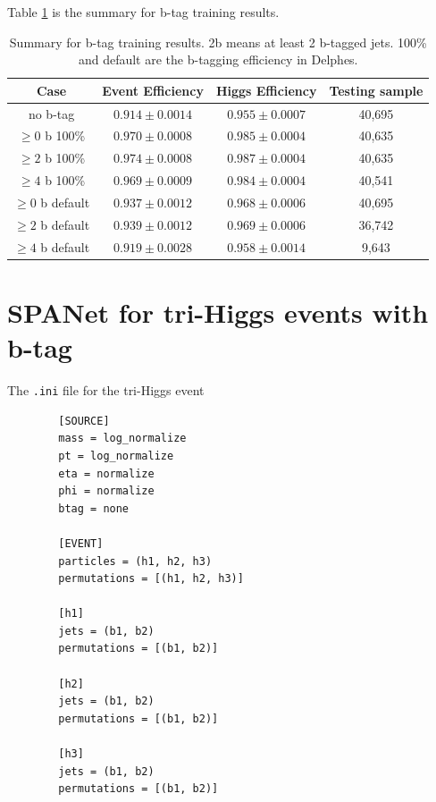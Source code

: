 \documentclass[12pt]{article}
\begin{document}
		Table \ref{tab:comparision_btag_results} is the summary for b-tag training results.
		\begin{table}[htpb]
			\centering
			\caption{Summary for b-tag training results. 2b means at least 2 b-tagged jets. 100\% and default are the b-tagging efficiency in Delphes.}
			\label{tab:comparision_btag_results}
			\begin{tabular}{c|cc|c}
				Case & Event Efficiency & Higgs Efficiency & Testing sample \\
				\hline
				no b-tag	         &  $0.914 \pm 0.0014$   &  $0.955 \pm 0.0007$  &  40,695	\\
				$\ge 0$ b 100\%	     &  $0.970 \pm 0.0008$   &  $0.985 \pm 0.0004$  &  40,635	\\
				$\ge 2$ b 100\%	     &  $0.974 \pm 0.0008$   &  $0.987 \pm 0.0004$  &  40,635	\\
				$\ge 4$ b 100\%	     &  $0.969 \pm 0.0009$   &  $0.984 \pm 0.0004$  &  40,541	\\
				$\ge 0$ b default	 &  $0.937 \pm 0.0012$   &  $0.968 \pm 0.0006$  &  40,695	\\
				$\ge 2$ b default	 &  $0.939 \pm 0.0012$   &  $0.969 \pm 0.0006$  &  36,742	\\
				$\ge 4$ b default	 &  $0.919 \pm 0.0028$   &  $0.958 \pm 0.0014$  &  9,643	\\
			\end{tabular}
		\end{table}



\section{SPANet for tri-Higgs events with b-tag}%
\label{sec:spanet_for_tri_higgs_events_with_b_tag}
	The \verb+.ini+ file for the tri-Higgs event
	\begin{verbatim}
		[SOURCE]
		mass = log_normalize
		pt = log_normalize
		eta = normalize
		phi = normalize
		btag = none

		[EVENT]
		particles = (h1, h2, h3)
		permutations = [(h1, h2, h3)]

		[h1]
		jets = (b1, b2)
		permutations = [(b1, b2)]

		[h2]
		jets = (b1, b2)
		permutations = [(b1, b2)]

		[h3]
		jets = (b1, b2)
		permutations = [(b1, b2)]		
	\end{verbatim}
\end{document}
